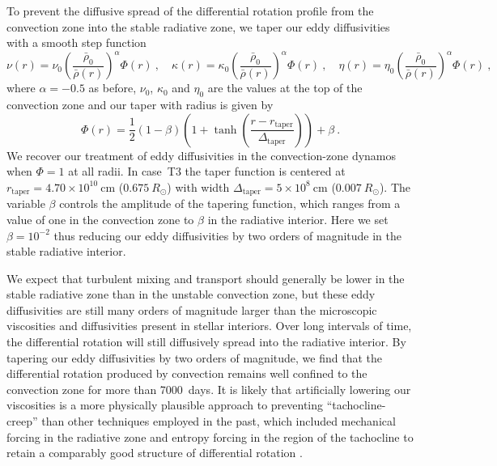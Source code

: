 \clearpage
To prevent the diffusive spread of the differential rotation profile
from the convection zone into the stable radiative zone, we taper our
eddy diffusivities with a smooth step function 
\begin{equation}
     \nu(r)  = \nu_0 \left(\frac{\bar{\rho}_0}{\bar{\rho}(r)}\right)^\alpha \Phi(r)\:,
     \quad %
     \kappa(r)  = \kappa_0 \left(\frac{\bar{\rho}_0}{\bar{\rho}(r)}\right)^\alpha \Phi(r)\:,
     \quad %
     \eta(r)  = \eta_0 \left(\frac{\bar{\rho}_0}{\bar{\rho}(r)}\right)^\alpha \Phi(r)\:,
\end{equation}
where $\alpha=-0.5$ as before, $\nu_0$, $\kappa_0$ and $\eta_0$ are the values
at the top of the convection zone and our taper with radius is given by
\begin{equation}
  \Phi(r) = \frac{1}{2} \left(1 - \beta\right)
  \left( 1 + \tanh{\left(\frac{r - r_\mathrm{taper}}{\Delta_\mathrm{taper}}\right)}\right) +\beta\:.
\end{equation}
We recover our treatment of eddy diffusivities in the convection-zone
dynamos when $\Phi=1$ at all radii.
In case~T3 the taper function is centered at $r_\mathrm{taper}=4.70
\times 10^{10}\:$cm ($0.675\:R_\odot$) with width
$\Delta_\mathrm{taper}=5 \times 10^{8}\:$cm ($0.007\:R_\odot$).
The variable $\beta$ controls the amplitude of the tapering function,
which ranges from a value of one in the convection zone to $\beta$ in
the radiative interior.  Here we set $\beta=10^{-2}$ thus reducing our
eddy diffusivities by two orders of magnitude in the stable radiative interior.

We expect that turbulent mixing and transport should
generally be lower in the stable radiative zone than in the unstable
convection zone, but these eddy diffusivities are still many orders of
magnitude larger than the microscopic viscosities and diffusivities
present in stellar interiors.  Over long intervals of time, the
differential rotation will still diffusively spread into the radiative
interior.  By tapering our eddy diffusivities by two orders of
magnitude, we find that the differential rotation produced by
convection remains well confined to the convection zone for more than
7000~days. It is likely that artificially lowering our
viscosities is a more physically plausible approach to preventing
``tachocline-creep'' than other techniques employed in the
past, which included mechanical forcing in the radiative zone and
entropy forcing in the region of the tachocline to retain a comparably
good structure of differential rotation
\citep[e.g.,][]{Browning_et_al_2006}.  

